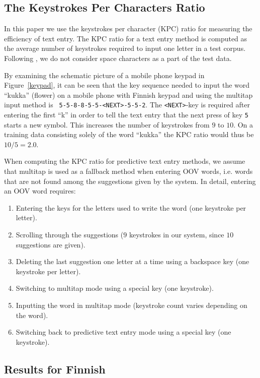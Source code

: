 \documentclass{llncs}
\begin{document}
\subsection{The Keystrokes Per Characters Ratio}

In this paper we use the keystrokes per character (KPC)
ratio for measuring the efficiency of text
entry. The KPC ratio for a text entry method is computed as the
average number of keystrokes required to input one letter in a test
corpus. Following \cite{Tantug:2010}, we do not consider space
characters as a part of the test data.

By examining the schematic picture of a mobile phone keypad in
Figure~\ref{keypad}, it can be seen that the key sequence needed to
input the word ``kukka'' (flower) on a mobile phone with Finnish keypad
and using the multitap input method is {\tt
  5-5-8-8-5-5-<NEXT>-5-5-2}. The {\tt <NEXT>}-key is required after
entering the first ``k'' in order to tell the text entry that the next
press of key {\tt 5} starts a new symbol. This increases the number of
keystrokes from $9$ to $10$. On a training data consisting solely of
the word ``kukka'' the KPC ratio would thus be $10/5 = 2.0$.


When computing the KPC ratio for predictive text entry methods, we assume
that multitap is used as a fallback method when entering OOV words,
i.e. words that are not found among the suggestions given by the
system. In detail, entering an OOV word requires:
\begin{enumerate}
\item Entering the keys for the letters used to write the word (one
  keystroke per letter).
\item Scrolling through the suggestions ($9$ keystrokes in our system,
  since $10$ suggestions are given).
\item Deleting the last suggestion one letter at a time using a
  backspace key (one keystroke per letter).
\item Switching to multitap mode using a special key (one
  keystroke).
\item Inputting the word in multitap mode (keystroke count varies
  depending on the word).
\item Switching back to predictive text entry mode using a special key (one keystroke).
\end{enumerate}

\subsection{Results for Finnish}
\end{document}

